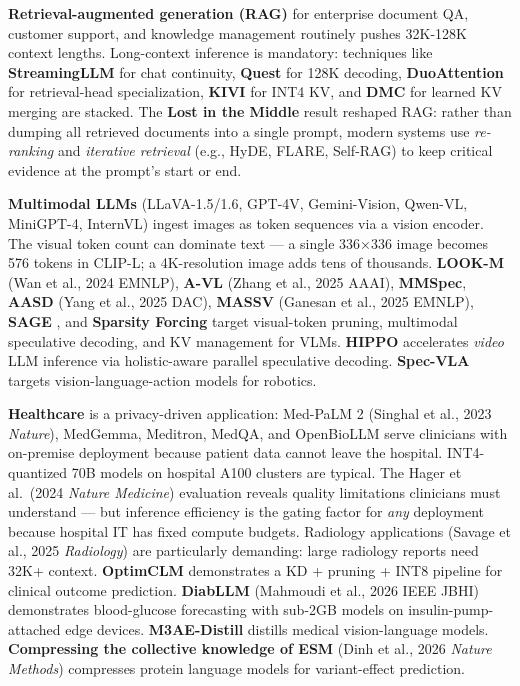 \documentclass{article}
\begin{document}
\textbf{Retrieval-augmented generation (RAG)} for enterprise document QA, customer support, and knowledge management routinely pushes 32K-128K context lengths. Long-context inference is mandatory: techniques like \textbf{StreamingLLM} for chat continuity, \textbf{Quest} for 128K decoding, \textbf{DuoAttention} for retrieval-head specialization, \textbf{KIVI} for INT4 KV, and \textbf{DMC} for learned KV merging are stacked. The \textbf{Lost in the Middle} result \citep{liu20242024} reshaped RAG: rather than dumping all retrieved documents into a single prompt, modern systems use \emph{re-ranking} and \emph{iterative retrieval} (e.g., HyDE, FLARE, Self-RAG) to keep critical evidence at the prompt's start or end.

\textbf{Multimodal LLMs} (LLaVA-1.5/1.6, GPT-4V, Gemini-Vision, Qwen-VL, MiniGPT-4, InternVL) ingest images as token sequences via a vision encoder. The visual token count can dominate text --- a single 336×336 image becomes 576 tokens in CLIP-L; a 4K-resolution image adds tens of thousands. \textbf{LOOK-M} (Wan et al., 2024 EMNLP), \textbf{A-VL} (Zhang et al., 2025 AAAI), \textbf{MMSpec}, \textbf{AASD} (Yang et al., 2025 DAC), \textbf{MASSV} (Ganesan et al., 2025 EMNLP), \textbf{SAGE} \citep{tong20262026}, and \textbf{Sparsity Forcing} \citep{chen20252025} target visual-token pruning, multimodal speculative decoding, and KV management for VLMs. \textbf{HIPPO} \citep{lv20262026} accelerates \emph{video} LLM inference via holistic-aware parallel speculative decoding. \textbf{Spec-VLA} \citep{wang20252025} targets vision-language-action models for robotics.

\textbf{Healthcare} is a privacy-driven application: Med-PaLM 2 (Singhal et al., 2023 \emph{Nature}), MedGemma, Meditron, MedQA, and OpenBioLLM serve clinicians with on-premise deployment because patient data cannot leave the hospital. INT4-quantized 70B models on hospital A100 clusters are typical. The Hager et al.~(2024 \emph{Nature Medicine}) evaluation reveals quality limitations clinicians must understand --- but inference efficiency is the gating factor for \emph{any} deployment because hospital IT has fixed compute budgets. Radiology applications (Savage et al., 2025 \emph{Radiology}) are particularly demanding: large radiology reports need 32K+ context. \textbf{OptimCLM} \citep{hasan2025optimclmoptimizing} demonstrates a KD + pruning + INT8 pipeline for clinical outcome prediction. \textbf{DiabLLM} (Mahmoudi et al., 2026 IEEE JBHI) demonstrates blood-glucose forecasting with sub-2GB models on insulin-pump-attached edge devices. \textbf{M3AE-Distill} \citep{liang20252025} distills medical vision-language models. \textbf{Compressing the collective knowledge of ESM} (Dinh et al., 2026 \emph{Nature Methods}) compresses protein language models for variant-effect prediction.
\end{document}
